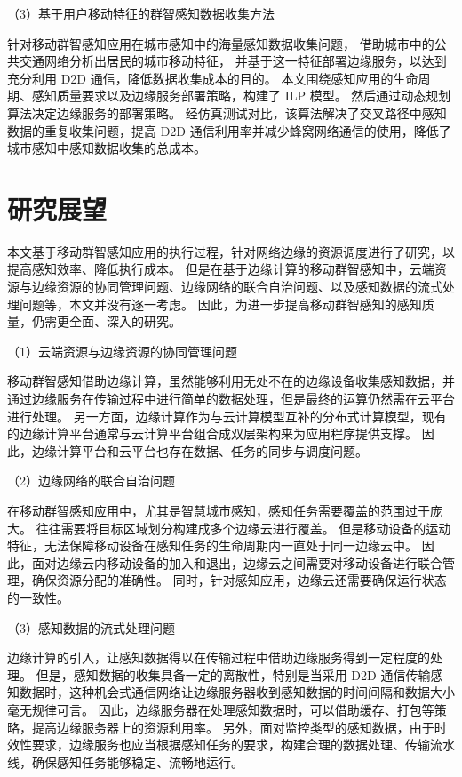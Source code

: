 （3）基于用户移动特征的群智感知数据收集方法

针对移动群智感知应用在城市感知中的海量感知数据收集问题，
借助城市中的公共交通网络分析出居民的城市移动特征，
并基于这一特征部署边缘服务，以达到充分利用 D2D 通信，降低数据收集成本的目的。
本文围绕感知应用的生命周期、感知质量要求以及边缘服务部署策略，构建了 ILP 模型。
然后通过动态规划算法决定边缘服务的部署策略。
经仿真测试对比，该算法解决了交叉路径中感知数据的重复收集问题，提高 D2D 通信利用率并减少蜂窝网络通信的使用，降低了城市感知中感知数据收集的总成本。

\section{研究展望}

本文基于移动群智感知应用的执行过程，针对网络边缘的资源调度进行了研究，以提高感知效率、降低执行成本。
但是在基于边缘计算的移动群智感知中，云端资源与边缘资源的协同管理问题、边缘网络的联合自治问题、以及感知数据的流式处理问题等，本文并没有逐一考虑。
因此，为进一步提高移动群智感知的感知质量，仍需更全面、深入的研究。

（1）云端资源与边缘资源的协同管理问题

移动群智感知借助边缘计算，虽然能够利用无处不在的边缘设备收集感知数据，并通过边缘服务在传输过程中进行简单的数据处理，但是最终的运算仍然需在云平台进行处理。
另一方面，边缘计算作为与云计算模型互补的分布式计算模型，现有的边缘计算平台通常与云计算平台组合成双层架构来为应用程序提供支撑。
因此，边缘计算平台和云平台也存在数据、任务的同步与调度问题。

（2）边缘网络的联合自治问题

在移动群智感知应用中，尤其是智慧城市感知，感知任务需要覆盖的范围过于庞大。
往往需要将目标区域划分构建成多个边缘云进行覆盖。
但是移动设备的运动特征，无法保障移动设备在感知任务的生命周期内一直处于同一边缘云中。
因此，面对边缘云内移动设备的加入和退出，边缘云之间需要对移动设备进行联合管理，确保资源分配的准确性。
同时，针对感知应用，边缘云还需要确保运行状态的一致性。

（3）感知数据的流式处理问题

边缘计算的引入，让感知数据得以在传输过程中借助边缘服务得到一定程度的处理。
但是，感知数据的收集具备一定的离散性，特别是当采用 D2D 通信传输感知数据时，这种机会式通信网络让边缘服务器收到感知数据的时间间隔和数据大小毫无规律可言。
因此，边缘服务器在处理感知数据时，可以借助缓存、打包等策略，提高边缘服务器上的资源利用率。
另外，面对监控类型的感知数据，由于时效性要求，边缘服务也应当根据感知任务的要求，构建合理的数据处理、传输流水线，确保感知任务能够稳定、流畅地运行。
